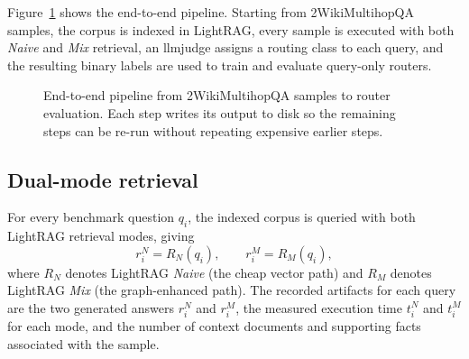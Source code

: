 \documentclass[english, bibtex]{kththesis}               %
\numberwithin{listing}{chapter}
\begin{document}
Figure~\ref{fig:methodPipeline} shows the end-to-end pipeline. Starting from 2WikiMultihopQA samples, the corpus is indexed in LightRAG, every sample is executed with both \emph{Naive} and \emph{Mix} retrieval, an \gls{llmjudge} assigns a routing class to each query, and the resulting binary labels are used to train and evaluate query-only routers.

\begin{figure}[!ht]
\centering
{}
\caption{End-to-end pipeline from 2WikiMultihopQA samples to router evaluation. Each step writes its output to disk so the remaining steps can be re-run without repeating expensive earlier steps.}
\label{fig:methodPipeline}
\end{figure}

\subsection{Dual-mode retrieval}
\label{sec:methodDualMode}

For every benchmark question \(q_i\), the indexed corpus is queried with both LightRAG retrieval modes, giving
\begin{equation}
\label{eq:dualModeOutputs}
r_i^{N} = R_N(q_i),
\qquad
r_i^{M} = R_M(q_i),
\end{equation}
where \(R_N\) denotes LightRAG \emph{Naive} (the cheap vector path) and \(R_M\) denotes LightRAG \emph{Mix} (the graph-enhanced path). The recorded artifacts for each query are the two generated answers \(r_i^N\) and \(r_i^M\), the measured execution time \(t_i^N\) and \(t_i^M\) for each mode, and the number of context documents and supporting facts associated with the sample.
\end{document}
